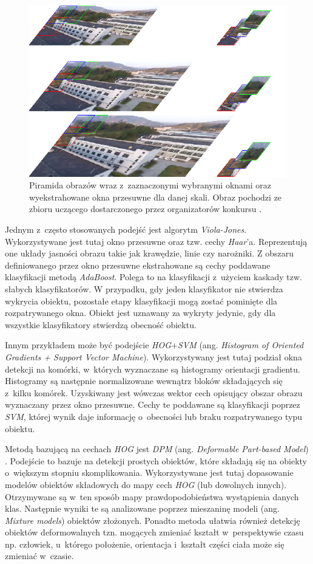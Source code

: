 \begin{figure}
    \centering
    \includegraphics[width=0.9\linewidth]{images/piramid.png}
    \caption{Piramida obrazów wraz z~zaznaczonymi wybranymi oknami oraz wyekstrahowane okna przesuwne dla danej skali. Obraz pochodzi ze zbioru uczącego dostarczonego przez organizatorów konkursu \cite{dac_sdc_2021}.}
    \label{fig:sliding_window}
\end{figure}


Jednym z~często stosowanych podejść jest algorytm \emph{Viola-Jones}\cite{viola_jones}. 
Wykorzystywane jest tutaj okno przesuwne oraz tzw. cechy \emph{Haar}'a.
Reprezentują one układy jasności obrazu takie jak krawędzie, linie czy narożniki. 
Z obszaru definiowanego przez okno przesuwne ekstrahowane są cechy poddawane klasyfikacji metodą \emph{AdaBoost}.
Polega to na klasyfikacji z~użyciem kaskady tzw. słabych klasyfikatorów.
W przypadku, gdy jeden klasyfikator nie stwierdza wykrycia obiektu, pozostałe etapy klasyfikacji mogą zostać pominięte dla rozpatrywanego okna.
Obiekt jest uznawany za wykryty jedynie, gdy dla wszystkie klasyfikatory stwierdzą obecność obiektu. 

Innym przykładem może być podejście \emph{HOG}+\emph{SVM}\cite{hog} (ang. \emph{Histogram of Oriented Gradients + Support Vector Machine}). 
Wykorzystywany jest tutaj podział okna detekcji na komórki, w~których wyznaczane są histogramy orientacji gradientu. 
Histogramy są następnie normalizowane wewnątrz bloków składających się z~kilku komórek. 
Uzyskiwany jest wówczas wektor cech opisujący obszar obrazu wyznaczany przez okno przesuwne. 
Cechy te poddawane są klasyfikacji poprzez \emph{SVM}, której wynik daje informację o~obecności lub braku rozpatrywanego typu obiektu.

Metodą bazującą na cechach \emph{HOG} jest \emph{DPM} (ang. \emph{Deformable Part-based Model}) \cite{model_based}.
Podejście to bazuje na detekcji prostych obiektów, które składają się na obiekty o~większym stopniu skomplikowania.
Wykorzystywane jest tutaj dopasowanie modelów obiektów składowych do mapy cech \emph{HOG} (lub dowolnych innych).
Otrzymywane są w~ten sposób mapy prawdopodobieństwa wystąpienia danych klas.
Następnie wyniki te są analizowane poprzez mieszaninę modeli (ang. \emph{Mixture models}) obiektów złożonych.
Ponadto metoda ułatwia również detekcję obiektów deformowalnych tzn. mogących zmieniać kształt w~perspektywie czasu np. człowiek, u~którego położenie, orientacja i~kształt części ciała może się zmieniać w~czasie.



